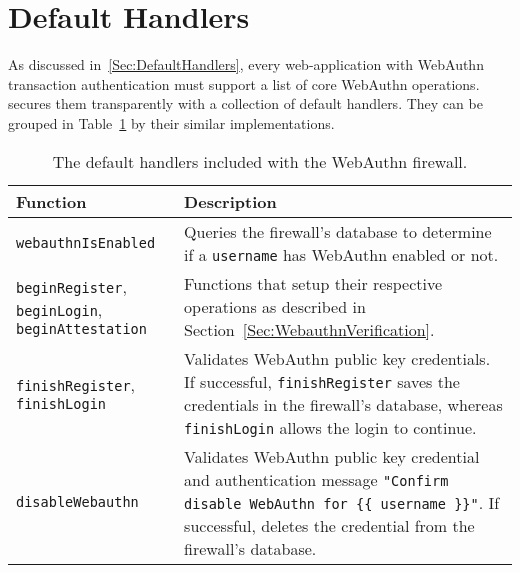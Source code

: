 \section{Default Handlers}

As discussed in~\ref{Sec:DefaultHandlers}, every web-application with WebAuthn transaction authentication must support a list of core WebAuthn operations. \sys{} secures them transparently with a collection of default handlers. They can be grouped in Table~\ref{Table:Implementation_DefaultHandlers} by their similar implementations.


\begin{table}[h]
\centering

\begin{tabular}{ m{3cm} m{11cm}  } 
 \hline
 Function & Description \\ 
 \hline \hline

 \lstinline|webauthnIsEnabled| & Queries the firewall's database to determine if a \lstinline|username| has WebAuthn enabled or not. \\ \hline

 \lstinline|beginRegister|, \lstinline|beginLogin|, \lstinline|beginAttestation| & Functions that setup their respective operations as described in Section~\ref{Sec:WebauthnVerification}. \\ \hline

 \lstinline|finishRegister|, \lstinline|finishLogin| & Validates WebAuthn public key credentials. If successful, \lstinline|finishRegister| saves the credentials in the firewall's database, whereas \lstinline|finishLogin| allows the login to continue. \\ \hline

 \lstinline|disableWebauthn| & Validates WebAuthn public key credential and authentication message \lstinline|"Confirm disable WebAuthn for {{ username }}"|. If successful, deletes the credential from the firewall's database. \\ \hline

\end{tabular}
\caption{The default handlers included with the WebAuthn firewall.}
\label{Table:Implementation_DefaultHandlers}
\end{table}

